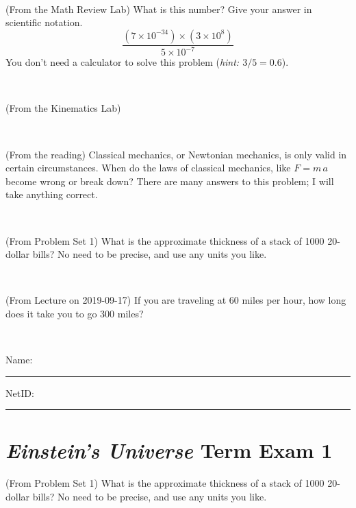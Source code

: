\documentclass[12pt, letterpaper]{article}
\begin{document}
\vfill ~

\begin{problem} (From the Math Review Lab)
What is this number? Give your answer in scientific notation.
$$
\frac{(7\times10^{-34})\times(3\times10^8)}{5\times10^{-7}}
$$
You don't need a calculator to solve this problem (\textit{hint: $3/5=0.6$}).
\end{problem}


\vfill ~


\clearpage


\begin{problem} (From the Kinematics Lab)

\end{problem}


\vfill ~

\begin{problem} (From the reading)
Classical mechanics, or Newtonian mechanics, is only valid in certain
circumstances. When do the laws of classical mechanics, like $F =
m\,a$ become wrong or break down? There are many answers to this
problem; I will take anything correct.
\end{problem}


\vfill ~

\begin{problem} (From Problem Set 1)
What is the approximate thickness of a stack of 1000 20-dollar bills?
No need to be precise, and use any units you like.
\end{problem}


\vfill ~

\begin{problem} (From Lecture on 2019-09-17)
If you are traveling at 60 miles per hour, how long does
it take you to go 300 miles?
\end{problem}


\vfill ~


\cleardoublepage



\noindent
Name: \rule[-1ex]{0.60\textwidth}{0.1pt}
NetID: \rule[-1ex]{0.20\textwidth}{0.1pt}

\section*{\textsl{Einstein's Universe} Term Exam 1}
\setcounter{problem}{1}


\begin{problem} (From Problem Set 1)
What is the approximate thickness of a stack of 1000 20-dollar bills?
No need to be precise, and use any units you like.
\end{problem}
\end{document}
